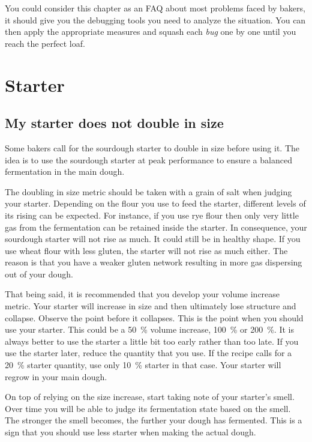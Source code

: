 \begin{quoting}
You could consider this chapter as an FAQ about most problems faced by
bakers, it should give you the debugging tools you need to analyze the
situation.  You can then apply the appropriate measures and squash each
\emph{bug} one by one until you reach the perfect loaf.
\end{quoting}

\section{Starter}
\subsection{My starter does not double in size}

Some bakers call for the sourdough starter to double in size before using it.
The idea is to use the sourdough starter at peak performance to ensure a
balanced fermentation in the main dough.

The doubling in size metric should be taken with a grain of salt when judging
your starter. Depending on the flour you use to feed the starter, different
levels of its rising can be expected.  For instance, if you use rye flour then
only very little gas from the fermentation can be retained inside the starter.
In consequence, your sourdough starter will not rise as much. It could still
be in healthy shape. If you use wheat flour with less gluten, the starter will
not rise as much either. The reason is that you have a weaker gluten network
resulting in more gas dispersing out of your dough.

That being said, it is recommended that you develop your volume increase
metric. Your starter will increase in size and then ultimately lose structure
and collapse. Observe the point before it collapses.  This is the point when
you should use your starter. This could be a \qty{50}{\percent} volume
increase, \qty{100}{\percent} or \qty{200}{\percent}. It is always better to
use the starter a little bit too early rather than too late. If you use the
starter later, reduce the quantity that you use. If the recipe calls for a
\qty{20}{\percent} starter quantity, use only \qty{10}{\percent} starter in
that case. Your starter will regrow in your main dough.

On top of relying on the size increase, start taking note of your starter's
smell. Over time you will be able to judge its fermentation state based on the
smell. The stronger the smell becomes, the further your dough has fermented.
This is a sign that you should use less starter when making the actual dough.

